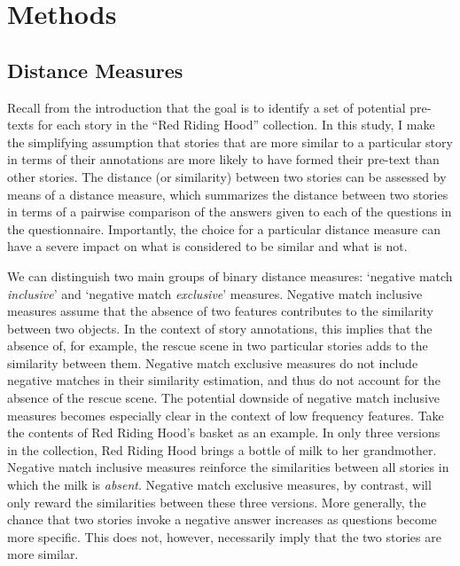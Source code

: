 \section{Methods}\label{sec:methods}

\subsection{Distance Measures}
Recall from the introduction that the goal is to identify a set of potential pre-texts for each story in the ``Red Riding Hood'' collection. In this study, I make the simplifying assumption that stories that are more similar to a particular story in terms of their annotations are more likely to have formed their pre-text than other stories. The distance (or similarity) between two stories can be assessed by means of a distance measure, which summarizes the distance between two stories in terms of a pairwise comparison of the answers given to each of the questions in the questionnaire. Importantly, the choice for a particular distance measure can have a severe impact on what is considered to be similar and what is not\autocite[Numerous papers have been published in which various binary distance metrics and similarity coefficients have been proposed. For an in-depth comparison, cf.][]{choi:2010}. 

We can distinguish two main groups of binary distance measures: `negative match \emph{inclusive}' and `negative match \emph{exclusive}' measures. Negative match inclusive measures assume that the absence of two features contributes to the similarity between two objects. In the context of story annotations, this implies that the absence of, for example, the rescue scene in two particular stories adds to the similarity between them. Negative match exclusive measures do not include negative matches in their similarity estimation, and thus do not account for the absence of the rescue scene. The potential downside of negative match inclusive measures becomes especially clear in the context of low frequency features. Take the contents of Red Riding Hood's basket as an example. In only three versions in the collection, Red Riding Hood brings a bottle of milk to her grandmother. Negative match inclusive measures reinforce the similarities between all stories in which the milk is \emph{absent}. Negative match exclusive measures, by contrast, will only reward the similarities between these three versions. More generally, the chance that two stories invoke a negative answer increases as questions become more specific. This does not, however, necessarily imply that the two stories are more similar. 

